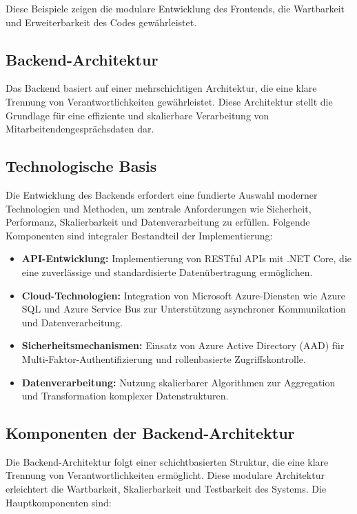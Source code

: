 Diese Beispiele zeigen die modulare Entwicklung des Frontends, die Wartbarkeit und Erweiterbarkeit des Codes gewährleistet.

\subsection{Backend-Architektur}
Das Backend basiert auf einer mehrschichtigen Architektur, die eine klare Trennung von Verantwortlichkeiten gewährleistet. Diese Architektur stellt die Grundlage für eine effiziente und skalierbare Verarbeitung von Mitarbeitendengesprächsdaten dar.

\subsection{Technologische Basis}
Die Entwicklung des Backends erfordert eine fundierte Auswahl moderner Technologien und Methoden, um zentrale Anforderungen wie Sicherheit, Performanz, Skalierbarkeit und Datenverarbeitung zu erfüllen. Folgende Komponenten sind integraler Bestandteil der Implementierung:
\begin{itemize}
    \item \textbf{API-Entwicklung:} Implementierung von RESTful APIs mit .NET Core, die eine zuverlässige und standardisierte Datenübertragung ermöglichen.
    \item \textbf{Cloud-Technologien:} Integration von Microsoft Azure-Diensten wie Azure SQL und Azure Service Bus zur Unterstützung asynchroner Kommunikation und Datenverarbeitung.
    \item \textbf{Sicherheitsmechanismen:} Einsatz von Azure Active Directory (AAD) für Multi-Faktor-Authentifizierung und rollenbasierte Zugriffskontrolle.
    \item \textbf{Datenverarbeitung:} Nutzung skalierbarer Algorithmen zur Aggregation und Transformation komplexer Datenstrukturen.
\end{itemize}

\subsection{Komponenten der Backend-Architektur}
Die Backend-Architektur folgt einer schichtbasierten Struktur, die eine klare Trennung von Verantwortlichkeiten ermöglicht. Diese modulare Architektur erleichtert die Wartbarkeit, Skalierbarkeit und Testbarkeit des Systems. Die Hauptkomponenten sind:

